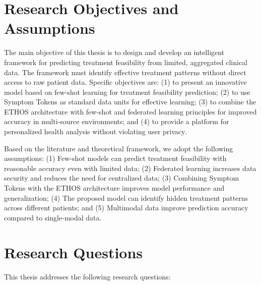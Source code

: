 \section{Research Objectives and Assumptions}

The main objective of this thesis is to design and develop an intelligent framework for predicting treatment feasibility from limited, aggregated clinical data. The framework must identify effective treatment patterns without direct access to raw patient data. Specific objectives are: (1) to present an innovative model based on few-shot learning for treatment feasibility prediction; (2) to use Symptom Tokens as standard data units for effective learning; (3) to combine the ETHOS architecture with few-shot and federated learning principles for improved accuracy in multi-source environments; and (4) to provide a platform for personalized health analysis without violating user privacy.

Based on the literature and theoretical framework, we adopt the following assumptions: (1) Few-shot models can predict treatment feasibility with reasonable accuracy even with limited data; (2) Federated learning increases data security and reduces the need for centralized data; (3) Combining Symptom Tokens with the ETHOS architecture improves model performance and generalization; (4) The proposed model can identify hidden treatment patterns across different patients; and (5) Multimodal data improve prediction accuracy compared to single-modal data.

\section{Research Questions}

This thesis addresses the following research questions:

